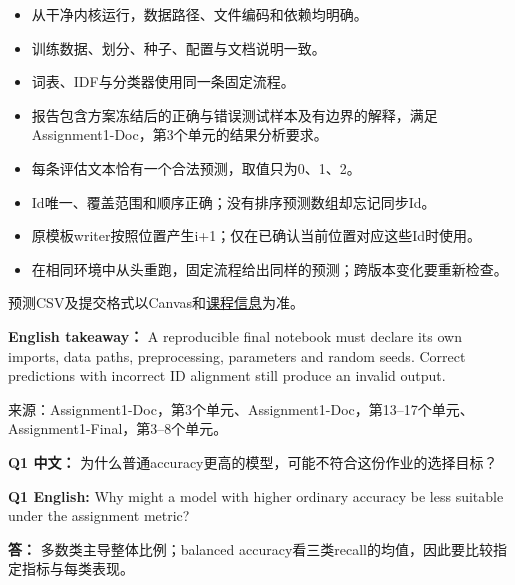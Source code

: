 \begin{itemize}

\item 从干净内核运行，数据路径、文件编码和依赖均明确。

\item 训练数据、划分、种子、配置与文档说明一致。

\item 词表、IDF与分类器使用同一条固定流程。

\item 报告包含方案冻结后的正确与错误测试样本及有边界的解释，满足Assignment1-Doc，第3个单元的结果分析要求。

\item 每条评估文本恰有一个合法预测，取值只为0、1、2。

\item Id唯一、覆盖范围和顺序正确；没有排序预测数组却忘记同步Id。

\item 原模板writer按照位置产生i+1；仅在已确认当前位置对应这些Id时使用。

\item 在相同环境中从头重跑，固定流程给出同样的预测；跨版本变化要重新检查。

\end{itemize}


预测CSV及提交格式以Canvas和\href{https://crazyshout.github.io/micro-course/notices.html?course=CS5489}{课程信息}为准。


\textbf{English takeaway：} A reproducible final notebook must declare its own imports, data paths, preprocessing, parameters and random seeds. Correct predictions with incorrect ID alignment still produce an invalid output.


来源：Assignment1-Doc，第3个单元、Assignment1-Doc，第13–17个单元、Assignment1-Final，第3–8个单元。








\textbf{Q1 中文：} 为什么普通accuracy更高的模型，可能不符合这份作业的选择目标？

\textbf{Q1 English:} Why might a model with higher ordinary accuracy be less suitable under the assignment metric?

\textbf{答：} 多数类主导整体比例；balanced accuracy看三类recall的均值，因此要比较指定指标与每类表现。

